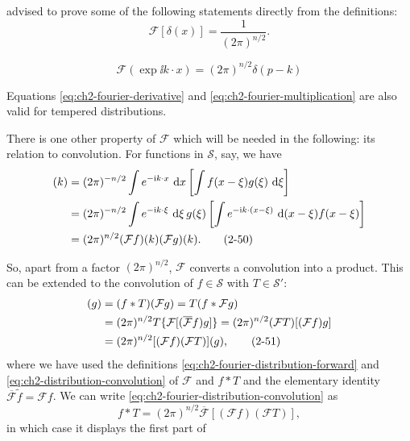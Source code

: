 advised to prove some of the following statements directly from the
definitions:
\begin{equation*}
  \mathcal{F}[\delta(x)] = \frac{1}{(2\pi)^{n/2}}.
\end{equation*}

\begin{equation}
  \mathcal{F}(\exp \ii k\mathbin{\cdot}x) = (2\pi)^{n/2}\delta(p-k)
  \tag{2-49}\label{eq:ch2-fourier-exponential}
\end{equation}

Equations \eqref{eq:ch2-fourier-derivative} and \eqref{eq:ch2-fourier-multiplication} are also valid for tempered distributions.

There is one other property of $\mathcal{F}$ which will be needed in the
following: its relation to convolution.  For functions in $\mathcal{S}$,
say, we have
\begin{align}
  [\mathcal{F}(f*g)](k)
  &= (2\pi)^{-n/2}\int e^{-\ii k\cdot x}\,\dd x
       \left[\int f(x-\xi)g(\xi)\,\dd\xi\right] \notag\\
  &= (2\pi)^{-n/2}\int e^{-\ii k\cdot\xi}\,\dd\xi\,g(\xi)
       \left[\int e^{-\ii k\cdot(x-\xi)}\,\dd(x-\xi)f(x-\xi)\right] \notag\\
  &= (2\pi)^{n/2}(\mathcal{F}f)(k)(\mathcal{F}g)(k).
  \tag{2-50}\label{eq:ch2-fourier-convolution}
\end{align}

So, apart from a factor $(2\pi)^{n/2}$, $\mathcal{F}$ converts a
convolution into a product.  This can be extended to the convolution of
$f\in\mathcal{S}$ with $T\in\mathcal{S}'$:
\begin{align}
  [\mathcal{F}(f*T)](g)
  &= (f*T)(\mathcal{F}g)=T(f*\mathcal{F}g) \notag\\
  &= (2\pi)^{n/2}T\{\mathcal{F}[(\overline{\mathcal{F}}f)g]\}
   = (2\pi)^{n/2}(\mathcal{F}T)[(\mathcal{F}f)g] \notag\\
  &= (2\pi)^{n/2}[(\mathcal{F}f)(\mathcal{F}T)](g),
  \tag{2-51}\label{eq:ch2-fourier-distribution-convolution}
\end{align}
where we have used the definitions \eqref{eq:ch2-fourier-distribution-forward} and \eqref{eq:ch2-distribution-convolution} of $\mathcal{F}$ and
$f*T$ and the elementary identity $\overline{\mathcal{F}}\widetilde{f}
=\mathcal{F}f$.  We can write \eqref{eq:ch2-fourier-distribution-convolution} as
\begin{equation}
  f*T=(2\pi)^{n/2}\overline{\mathcal{F}}
       [(\mathcal{F}f)(\mathcal{F}T)],
  \tag{2-52}\label{eq:ch2-fourier-convolution-distribution}
\end{equation}
in which case it displays the first part of

